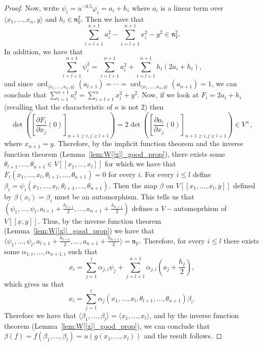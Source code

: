 \documentclass[10pt,a4paper]{amsart}
\DeclareMathOperator{\ord}{ord}
\newcommand{\naxV}{\mathfrak{n}_V}
\begin{document}
\begin{proof}
    \noindent Now,  write $\psi_i = u^{-0.5} \varphi_i = a_i + h_i$ where $a_i$ is a linear term over $\langle x_1, \dots, x_n,y \rangle$ and $h_i \in \naxV^2$. Then  we have that $$\sum_{i=l+1}^{n+1} a_i^2 - \sum_{i=l+1}^{n+1} x_i^2 - y^2 \in \naxV^2.$$ In addition, we have that 
    \begin{equation*}
        \sum_{i=l+1}^{n+1} \psi_i^2 = \sum_{i=l+1}^{n+1} a_i^2 + \sum_{i=l+1}^{n+1} h_i(2a_i+h_i),
    \end{equation*}
    and since $\ord_{\langle x_1, \dots, x_n,y \rangle}(a_{l+1}) =  \cdots =\ord_{\langle x_1, \dots, x_n,y \rangle}(a_{n+1})=1$,  we can conclude that $\sum_{i=1}^{n+1} a_i^2 = \sum_{i=l+1}^{n} x_i^2 +y^2$. Now, if we look at $F_i = 2a_i + h_i $ (recalling that the characteristic of $\kappa$ is not $2$) then  
    \begin{equation*}
        \det\left( \left[\frac{\partial F_i}{\partial x_j} \left(0\right)\right]_{n+1 \geq i,j \geq l+1}\right) =2\det\left( \left[\frac{\partial a_i}{\partial x_j} \left(0\right)\right]_{n+1 \geq i,j \geq l+1}\right) \in V^{\times},
    \end{equation*}
    \noindent where $x_{n+1}=y$. Therefore, by the implicit function theorem and the inverse function theorem (Lemma~\ref{lem:W[[x]]_good_prop}), there exists some $\theta_{l+1}, \dots, \theta_{n+1} \in V[[x_1, \dots, x_l]]$ for which we have that $F_i\left(x_1, \dots, x_l, \theta_{l+1}, \dots, \theta_{n+1}\right)=0$ for every $i$. For every $i \leq l$ define  $\beta_i = \psi_i\left(x_1, \dots, x_l, \theta_{l+1}, \dots, \theta_{n+1}\right)$. Then the map $\beta$ on $V[[x_1, \dots, x_l,y]]$ defined by $\beta\left(x_i\right)=\beta_i$ must be an automorphism. This tells us that $\left(\psi_1, \dots, \psi_l, a_{l+1}+\frac{h_{l+1}}{2}, \dots,  a_{n+1}+\frac{h_{n+1}}{2} \right)$ defines a $V-$automoprhism of $V[[\underline{x},y]]$. Thus, by the inverse function theorem (Lemma~\ref{lem:W[[x]]_good_prop}) we have that $\langle \psi_1, \dots, \psi_l, a_{l+1}+\frac{h_{l+1}}{2}, \dots,  a_{n+1}+\frac{h_{n+1}}{2} \rangle = \naxV$. Therefore, for every $i \leq l$ there exists some $\alpha_{1,i}, \dots,\alpha_{n+1,i}$ such that 
    \begin{equation*}
        x_i = \sum_{j=1}^l \alpha_{j,i} \psi_j + \sum_{j=l+1}^{n+1} \alpha_{j,i} \left(a_{j}+\frac{h_{j}}{2}\right), 
    \end{equation*}
    which gives us that 
    \begin{equation*}
        x_i=\sum_{j=1}^l \alpha_j\left(x_1, \dots, x_l, \theta_{l+1}, \dots, \theta_{n+1}\right) \beta_i. 
    \end{equation*}
    Therefore we have that $\langle \beta_1, \dots, \beta_l \rangle = \langle x_1, \dots, x_l \rangle$, and by the inverse function theorem (Lemma~\ref{lem:W[[x]]_good_prop}), we can conclude that $\beta(f)=f\left(\beta_1, \dots, \beta_l\right)= u\left(g\left(x_1, \dots, x_l\right)\right)$ and the result follows.
\end{proof}
\end{document}
